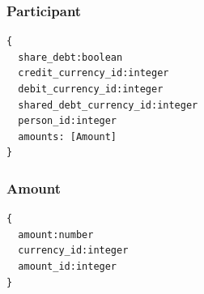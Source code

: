 \documentclass[a4paper,parskip=half]{scrartcl}
\begin{document}
\subsubsection{Participant}
\begin{Verbatim}
{
  share_debt:boolean
  credit_currency_id:integer
  debit_currency_id:integer
  shared_debt_currency_id:integer
  person_id:integer
  amounts: [Amount]
}
\end{Verbatim}

\subsubsection{Amount}
\begin{Verbatim}
{
  amount:number
  currency_id:integer
  amount_id:integer
}
\end{Verbatim}



\end{document}
